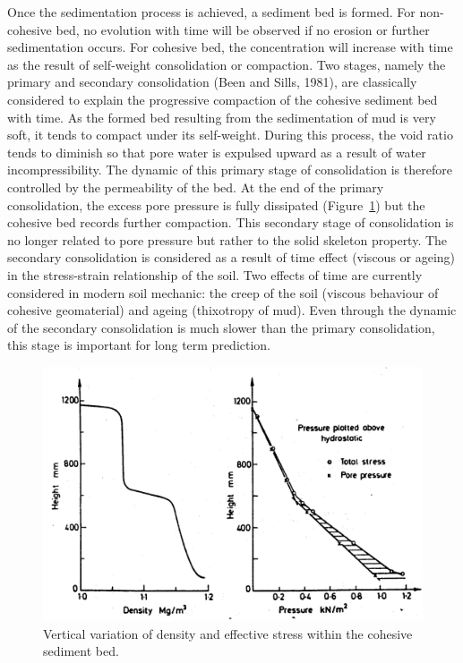 Once the sedimentation process is achieved, a sediment bed is formed. For
non-cohesive bed, no evolution with time will be observed if no erosion or
further sedimentation occurs. For cohesive bed, the concentration will
increase with time as the result of self-weight consolidation or compaction.
Two stages, namely the primary and secondary consolidation (Been and Sills,
1981), are classically considered to explain the progressive compaction of
the cohesive sediment bed with time. As the formed bed resulting from the
sedimentation of mud is very soft, it tends to compact under its
self-weight. During this process, the void ratio tends to diminish so that
pore water is expulsed upward as a result of water incompressibility. The
dynamic of this primary stage of consolidation is therefore controlled by
the permeability of the bed. At the end of the primary consolidation, the
excess pore pressure is fully dissipated (Figure~\ref{fig:2}) but the cohesive bed
records further compaction. This secondary stage of consolidation is no
longer related to pore pressure but rather to the solid skeleton property.
The secondary consolidation is considered as a result of time effect
(viscous or ageing) in the stress-strain relationship of the soil. Two
effects of time are currently considered in modern soil mechanic: the creep
of the soil (viscous behaviour of cohesive geomaterial) and ageing
(thixotropy of mud). Even through the dynamic of the secondary consolidation
is much slower than the primary consolidation, this stage is important for
long term prediction.

\pagebreak

\begin{figure}[htb]
\begin{center}
\includegraphics[scale=1.0,angle=0]{graphics/fig2.png}
\caption{Vertical variation of density and effective stress within the
cohesive sediment bed.}\label{fig:2}
\end{center}
\end{figure}


